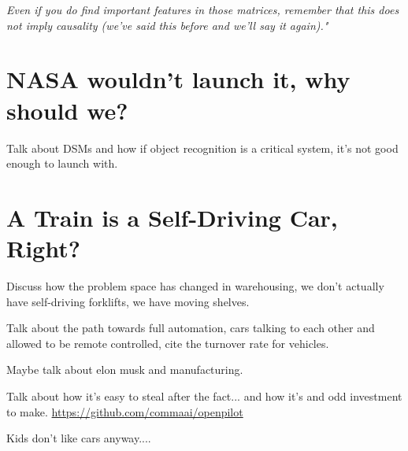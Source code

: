 \textit{Even if you do find important features in those matrices, remember that this does not imply causality (we've said this before and we'll say it again)."} \cite{trustworthyml}

\section{NASA wouldn't launch it, why should we?}

Talk about DSMs and how if object recognition is a critical system, it's not good enough to launch with.

\section{A Train is a Self-Driving Car, Right?}

Discuss how the problem space has changed in warehousing, we don't actually have self-driving forklifts, we have moving shelves.

Talk about the path towards full automation, cars talking to each other and allowed to be remote controlled, cite the turnover rate for vehicles.

Maybe talk about elon musk and manufacturing.

Talk about how it's easy to steal after the fact... and how it's and odd investment to make. \url{https://github.com/commaai/openpilot}

Kids don't like cars anyway.... 
